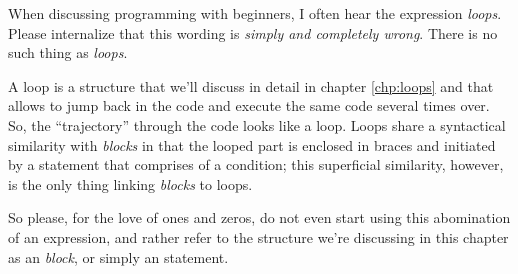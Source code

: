 \begin{warnbox}
When discussing programming with beginners, I often hear the expression  \emph{loops}. Please internalize that this wording is \emph{simply and completely wrong}. There is no such thing as  \emph{loops}.

A loop is a structure that we'll discuss in detail in chapter \ref{chp:loops} and that allows to jump back in the code and execute the same code several times over. So, the \enquote{trajectory} through the code looks like a loop. Loops share a syntactical similarity with  \emph{blocks} in that the looped part is enclosed in braces and initiated by a statement that comprises of a condition; this superficial similarity, however, is the only thing linking  \emph{blocks} to loops.

So please, for the love of ones and zeros, do not even start using this abomination of an expression, and rather refer to the structure we're discussing in this chapter as an  \emph{block}, or simply an  statement.
\end{warnbox}



